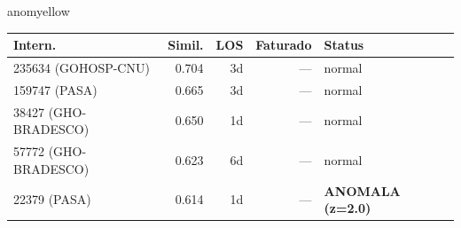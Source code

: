 \documentclass[a4paper,10pt]{article}
\begin{document}
\begin{anomalycard}[Internacao 277 | GHO-PETROBRAS | MODERADO (z=2.11)]{anomyellow}
\begin{tabular}{l r r r l}\toprule\textbf{Intern.} & \textbf{Simil.} & \textbf{LOS} & \textbf{Faturado} & \textbf{Status} \\\midrule
235634 (GOHOSP-CNU) & 0.704 & 3d & --- & \textcolor{jcubeblue}{normal} \\
159747 (PASA) & 0.665 & 3d & --- & \textcolor{jcubeblue}{normal} \\
38427 (GHO-BRADESCO) & 0.650 & 1d & --- & \textcolor{jcubeblue}{normal} \\
57772 (GHO-BRADESCO) & 0.623 & 6d & --- & \textcolor{jcubeblue}{normal} \\
22379 (PASA) & 0.614 & 1d & --- & \textcolor{anomred}{\textbf{ANOMALA (z=2.0)}} \\
\bottomrule\end{tabular}


\end{anomalycard}

\newpage
\end{document}
